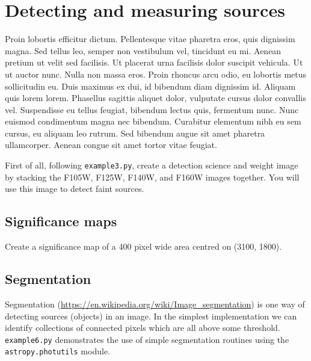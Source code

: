 \documentclass{article}
\begin{document}



\setcounter{Question}{0}
\section{Detecting and measuring sources}

Proin lobortis efficitur dictum. Pellentesque vitae pharetra eros, quis dignissim magna. Sed tellus leo, semper non vestibulum vel, tincidunt eu mi. Aenean pretium ut velit sed facilisis. Ut placerat urna facilisis dolor suscipit vehicula. Ut ut auctor nunc. Nulla non massa eros. Proin rhoncus arcu odio, eu lobortis metus sollicitudin eu. Duis maximus ex dui, id bibendum diam dignissim id. Aliquam quis lorem lorem. Phasellus sagittis aliquet dolor, vulputate cursus dolor convallis vel. Suspendisse eu tellus feugiat, bibendum lectus quis, fermentum nunc. Nunc euismod condimentum magna nec bibendum. Curabitur elementum nibh eu sem cursus, eu aliquam leo rutrum. Sed bibendum augue sit amet pharetra ullamcorper. Aenean congue sit amet tortor vitae feugiat.


\begin{question}
First of all, following \texttt{example3.py}, create a detection science and weight image by stacking the F105W, F125W, F140W, and F160W images together. You will use this image to detect faint sources.
\end{question}

\subsection{Significance maps}

\begin{question}
Create a significance map of a 400 pixel wide area centred on (3100, 1800).
\end{question}


\subsection{Segmentation}

Segmentation (\url{https://en.wikipedia.org/wiki/Image_segmentation}) is one way of detecting sources (objects) in an image. In the simplest implementation we can identify collections of connected pixels which are all above some threshold. \texttt{example6.py} demonstrates the use of simple segmentation routines using the \texttt{astropy.photutils} module.
\end{document}
